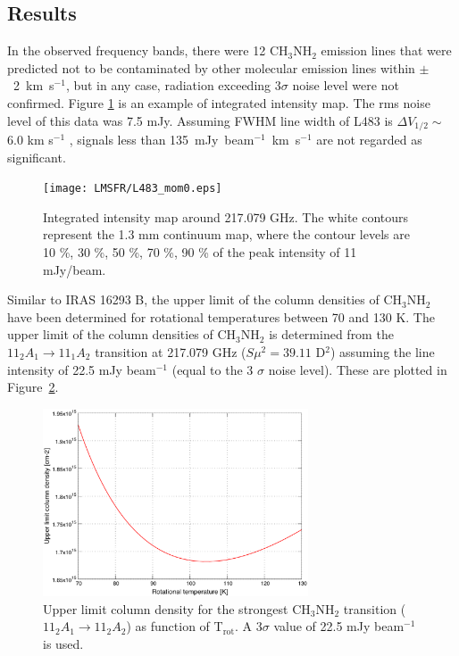 \subsection{Results}
In the observed frequency bands, there were 12 CH$_{3}$NH$_{2}$ emission lines that were predicted not to be contaminated 
by other molecular emission lines within $\pm$~2~km~s$^{-1}$, 
but in any case, radiation exceeding 3$\sigma$ noise level were not confirmed.
Figure \ref{L483_mom0} is an example of integrated intensity map.
The rms noise level of this data was 7.5 mJy.
Assuming FWHM line width of L483 is $\Delta V_{1/2} \sim$ 6.0 km s$^{-1}$ \citep{Oya+2017}, 
signals less than 135~mJy~beam$^{-1}$~km~s$^{-1}$ are not regarded as significant.

\begin{figure}[htp]
  \centering
  \texttt{[image: LMSFR/L483\_mom0.eps]}
  \caption{Integrated intensity map around 217.079 GHz. The white contours represent the 1.3 mm continuum map, where the contour levels are 10 \%, 30 \%, 50 \%, 70 \%, 90 \% of the peak intensity of 11 mJy/beam.}
  \label{L483_mom0}
\end{figure}

Similar to IRAS 16293 B, the upper limit of the column densities of CH$_{3}$NH$_{2}$ have been
determined for rotational temperatures between 70 and 130 K.
The upper limit of the column densities of CH$_{3}$NH$_{2}$ is determined from the
$11_{2}A_{1} \rightarrow 11_{1}A_{2}$ transition at 217.079 GHz ($S\mu^2 = 39.11$ D$^2$) assuming the line intensity  of 22.5 mJy beam$^{-1}$  (equal to the 3 $\sigma$ noise level).
These are plotted in Figure~\ref{L483_MA}.

\begin{figure}[htp]
  \centering
  \includegraphics[width=0.7\textwidth]{LMSFR/L483.eps}
  \caption{Upper limit column density for the strongest CH$_{3}$NH$_{2}$ transition
  ($11_{2}A_{1} \rightarrow 11_{2}A_{2}$) as function of T$_{\textrm{rot}}$. A 3$\sigma$ value of 
  22.5 mJy beam$^{-1}$ is used.}
  \label{L483_MA}
\end{figure}

